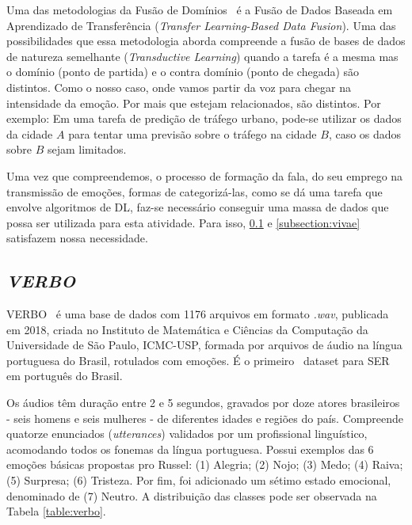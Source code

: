 Uma das metodologias da Fusão de Domínios~\cite{49} é a Fusão de Dados Baseada em Aprendizado de Transferência (\textit{Transfer Learning-Based Data Fusion}). Uma das possibilidades que essa metodologia aborda compreende a fusão de bases de dados de natureza semelhante (\textit{Transductive Learning}) quando a tarefa é a mesma mas o domínio (ponto de partida) e o contra domínio (ponto de chegada) são distintos. Como o nosso caso, onde vamos partir da voz para chegar na intensidade da emoção. Por mais que estejam relacionados, são distintos. Por exemplo: Em uma tarefa de predição de tráfego urbano, pode-se utilizar os dados da cidade $A$ para tentar uma previsão sobre o tráfego na cidade $B$, caso os dados sobre $B$ sejam limitados. 

Uma vez que compreendemos, o processo de formação da fala, do seu emprego na transmissão de emoções, formas de categorizá-las, como se dá uma tarefa que envolve algoritmos de \acrshort{DL}, faz-se necessário conseguir uma massa de dados que possa ser utilizada para esta atividade. Para isso, \ref{subsection:verbo} e \ref{subsection:vivae} satisfazem nossa necessidade.

\subsection{\textit{VERBO}}\label{subsection:verbo}

\acrlong{VERBO}~\cite{12.21} é uma base de dados com 1176 arquivos em formato \textit{.wav}, publicada em 2018, criada no Instituto de Matemática e Ciências da Computação da Universidade de São Paulo, ICMC-USP, formada por arquivos de áudio na língua portuguesa do Brasil, rotulados com emoções. É o primeiro~\cite{21} dataset para \acrshort{SER} em português do Brasil.

Os áudios têm duração entre 2 e 5 segundos, gravados por doze atores brasileiros - seis homens e seis mulheres - de diferentes idades e regiões do país. Compreende quatorze enunciados (\textit{utterances}) validados por um profissional linguístico, acomodando todos os fonemas da língua portuguesa. Possui exemplos das 6 emoções básicas propostas pro Russel: (1) Alegria; (2) Nojo; (3) Medo; (4) Raiva; (5) Surpresa; (6) Tristeza. Por fim, foi adicionado um sétimo estado emocional, denominado de (7) Neutro. A distribuição das classes pode ser observada na Tabela \ref{table:verbo}.

